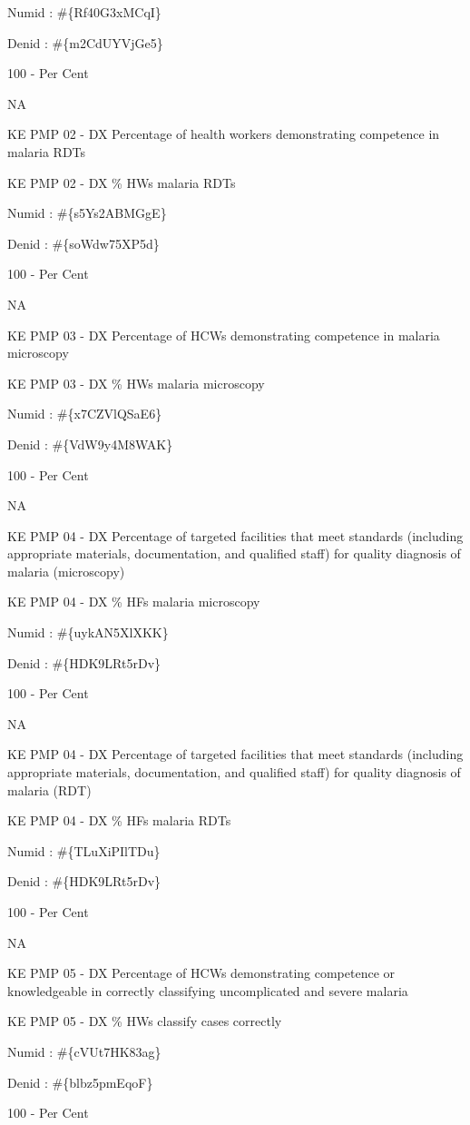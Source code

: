 \documentclass[]{book}
\begin{document}
Numid : \#\{Rf40G3xMCqI\}

Denid : \#\{m2CdUYVjGe5\}

100 - Per Cent

NA

KE PMP 02 - DX Percentage of health workers demonstrating competence in malaria RDTs

KE PMP 02 - DX \% HWs malaria RDTs

Numid : \#\{s5Ys2ABMGgE\}

Denid : \#\{soWdw75XP5d\}

100 - Per Cent

NA

KE PMP 03 - DX Percentage of HCWs demonstrating competence in malaria microscopy

KE PMP 03 - DX \% HWs malaria microscopy

Numid : \#\{x7CZVlQSaE6\}

Denid : \#\{VdW9y4M8WAK\}

100 - Per Cent

NA

KE PMP 04 - DX Percentage of targeted facilities that meet standards (including appropriate materials, documentation, and qualified staff) for quality diagnosis of malaria (microscopy)

KE PMP 04 - DX \% HFs malaria microscopy

Numid : \#\{uykAN5XlXKK\}

Denid : \#\{HDK9LRt5rDv\}

100 - Per Cent

NA

KE PMP 04 - DX Percentage of targeted facilities that meet standards (including appropriate materials, documentation, and qualified staff) for quality diagnosis of malaria (RDT)

KE PMP 04 - DX \% HFs malaria RDTs

Numid : \#\{TLuXiPIlTDu\}

Denid : \#\{HDK9LRt5rDv\}

100 - Per Cent

NA

KE PMP 05 - DX Percentage of HCWs demonstrating competence or knowledgeable in correctly classifying uncomplicated and severe malaria

KE PMP 05 - DX \% HWs classify cases correctly

Numid : \#\{cVUt7HK83ag\}

Denid : \#\{blbz5pmEqoF\}

100 - Per Cent
\end{document}

